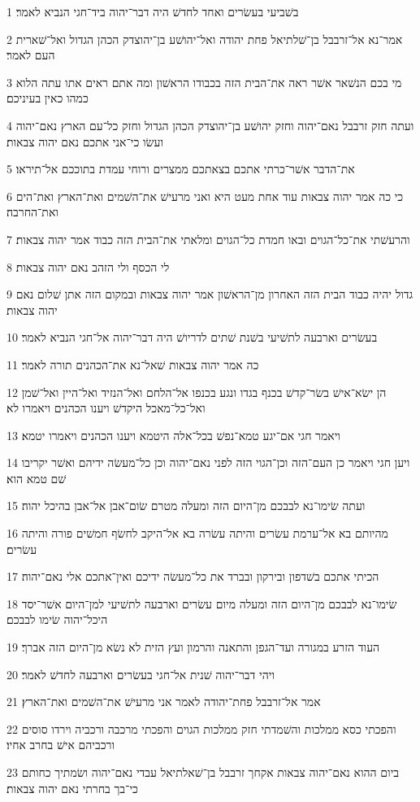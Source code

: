 \par 1 בשׁביעי בעשׂרים ואחד לחדשׁ היה דבר־יהוה ביד־חגי הנביא לאמר׃
\par 2 אמר־נא אל־זרבבל בן־שׁלתיאל פחת יהודה ואל־יהושׁע בן־יהוצדק הכהן הגדול ואל־שׁארית העם לאמר׃
\par 3 מי בכם הנשׁאר אשׁר ראה את־הבית הזה בכבודו הראשׁון ומה אתם ראים אתו עתה הלוא כמהו כאין בעיניכם׃
\par 4 ועתה חזק זרבבל נאם־יהוה וחזק יהושׁע בן־יהוצדק הכהן הגדול וחזק כל־עם הארץ נאם־יהוה ועשׂו כי־אני אתכם נאם יהוה צבאות׃
\par 5 את־הדבר אשׁר־כרתי אתכם בצאתכם ממצרים ורוחי עמדת בתוככם אל־תיראו׃
\par 6 כי כה אמר יהוה צבאות עוד אחת מעט היא ואני מרעישׁ את־השׁמים ואת־הארץ ואת־הים ואת־החרבה׃
\par 7 והרעשׁתי את־כל־הגוים ובאו חמדת כל־הגוים ומלאתי את־הבית הזה כבוד אמר יהוה צבאות׃
\par 8 לי הכסף ולי הזהב נאם יהוה צבאות׃
\par 9 גדול יהיה כבוד הבית הזה האחרון מן־הראשׁון אמר יהוה צבאות ובמקום הזה אתן שׁלום נאם יהוה צבאות׃
\par 10 בעשׂרים וארבעה לתשׁיעי בשׁנת שׁתים לדריושׁ היה דבר־יהוה אל־חגי הנביא לאמר׃
\par 11 כה אמר יהוה צבאות שׁאל־נא את־הכהנים תורה לאמר׃
\par 12 הן ישׂא־אישׁ בשׂר־קדשׁ בכנף בגדו ונגע בכנפו אל־הלחם ואל־הנזיד ואל־היין ואל־שׁמן ואל־כל־מאכל היקדשׁ ויענו הכהנים ויאמרו לא׃
\par 13 ויאמר חגי אם־יגע טמא־נפשׁ בכל־אלה היטמא ויענו הכהנים ויאמרו יטמא׃
\par 14 ויען חגי ויאמר כן העם־הזה וכן־הגוי הזה לפני נאם־יהוה וכן כל־מעשׂה ידיהם ואשׁר יקריבו שׁם טמא הוא׃
\par 15 ועתה שׂימו־נא לבבכם מן־היום הזה ומעלה מטרם שׂום־אבן אל־אבן בהיכל יהוה׃
\par 16 מהיותם בא אל־ערמת עשׂרים והיתה עשׂרה בא אל־היקב לחשׂף חמשׁים פורה והיתה עשׂרים׃
\par 17 הכיתי אתכם בשׁדפון ובירקון ובברד את כל־מעשׂה ידיכם ואין־אתכם אלי נאם־יהוה׃
\par 18 שׂימו־נא לבבכם מן־היום הזה ומעלה מיום עשׂרים וארבעה לתשׁיעי למן־היום אשׁר־יסד היכל־יהוה שׂימו לבבכם׃
\par 19 העוד הזרע במגורה ועד־הגפן והתאנה והרמון ועץ הזית לא נשׂא מן־היום הזה אברך׃
\par 20 ויהי דבר־יהוה שׁנית אל־חגי בעשׂרים וארבעה לחדשׁ לאמר׃
\par 21 אמר אל־זרבבל פחת־יהודה לאמר אני מרעישׁ את־השׁמים ואת־הארץ׃
\par 22 והפכתי כסא ממלכות והשׁמדתי חזק ממלכות הגוים והפכתי מרכבה ורכביה וירדו סוסים ורכביהם אישׁ בחרב אחיו׃
\par 23 ביום ההוא נאם־יהוה צבאות אקחך זרבבל בן־שׁאלתיאל עבדי נאם־יהוה ושׂמתיך כחותם כי־בך בחרתי נאם יהוה צבאות׃


